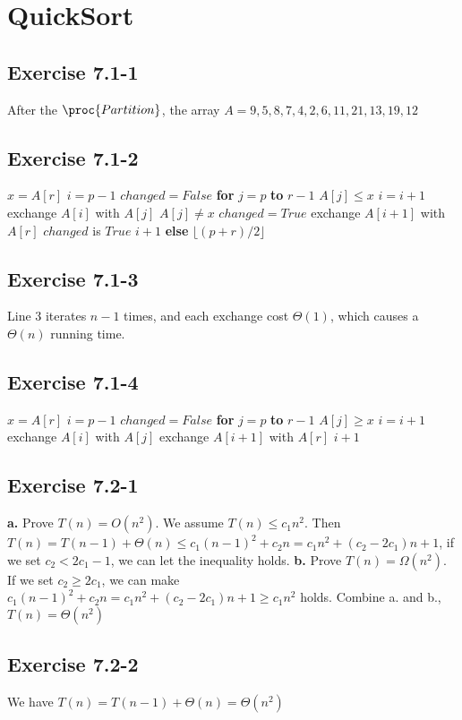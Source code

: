 \documentclass[12pt]{article}
\theoremstyle{definition}
\theoremstyle{remark}
\begin{document}
\section{QuickSort}
\subsection*{Exercise 7.1-1}
After the $\proc{Partition}$, the array $A={9,5,8,7,4,2,6,11,21,13,19,12}$
\subsection*{Exercise 7.1-2}
\begin{codebox}
\li $x=A[r]$
\li $i=p-1$
\li $changed=False$
\li \textbf{for} $j=p$ \textbf{to} $r-1$
\li \quad \If $A[j]\le x$
\li \qquad $i=i+1$
\li \qquad exchange $A[i]$ with $A[j]$
\li \qquad \If $A[j]\ne x$
\li \quad \qquad $changed=True$
\li exchange $A[i+1]$ with $A[r]$
\li \If $changed$ is $True$
\li \quad \Return $i+1$
\li \textbf{else}
\li \quad \Return $\lfloor(p+r)/2\rfloor$
\end{codebox}
\subsection*{Exercise 7.1-3}
Line 3 iterates $n-1$ times, and each exchange cost $\Theta(1)$, which causes a $\Theta(n)$ running time.
\subsection*{Exercise 7.1-4}
\begin{codebox}
\li $x=A[r]$
\li $i=p-1$
\li $changed=False$
\li \textbf{for} $j=p$ \textbf{to} $r-1$
\li \quad \If $A[j]\ge x$
\li \qquad $i=i+1$
\li \qquad exchange $A[i]$ with $A[j]$
\li exchange $A[i+1]$ with $A[r]$
\li \Return $i+1$
\end{codebox}
\subsection*{Exercise 7.2-1}
\textbf{a.} Prove $T(n)=O(n^2)$. We assume $T(n)\le c_1n^2$. Then $T(n)=T(n-1)+\Theta(n)\le c_1(n-1)^2+c_2n=c_1n^2+(c_2-2c_1)n+1$, if we set $c_2<2c_1-1$, we can let the inequality holds.
\textbf{b.} Prove $T(n)=\Omega(n^2)$. If we set $c_2\ge2c_1$, we can make $c_1(n-1)^2+c_2n=c_1n^2+(c_2-2c_1)n+1\ge c_1n^2$ holds.
Combine a. and b., $T(n)=\Theta(n^2)$
\subsection*{Exercise 7.2-2}
We have $T(n)=T(n-1)+\Theta(n)=\Theta(n^2)$
\end{document}
